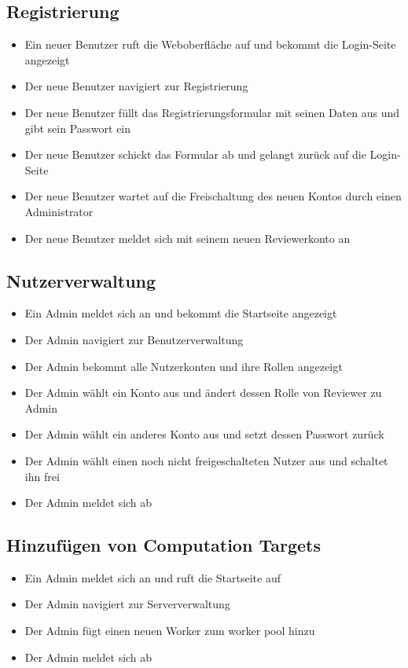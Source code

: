  \newpage
\subsection*{Registrierung}
\begin{itemize}
    \item Ein neuer Benutzer ruft die Weboberfläche auf und bekommt die Login-Seite angezeigt
    \item Der neue Benutzer navigiert zur Registrierung
    \item Der neue Benutzer füllt das Registrierungsformular mit seinen Daten aus und gibt sein Passwort ein
    \item Der neue Benutzer schickt das Formular ab und gelangt zurück auf die Login-Seite
    \item Der neue Benutzer wartet auf die Freischaltung des neuen Kontos durch einen Administrator
    \item Der neue Benutzer meldet sich mit seinem neuen \Gls{Reviewer}konto an %
\end{itemize}

\subsection*{Nutzerverwaltung}
\begin{itemize}
    \item Ein \Gls{Admin} meldet sich an und bekommt die Startseite angezeigt
    \item Der \Gls{Admin} navigiert zur Benutzerverwaltung
    \item Der \Gls{Admin} bekommt alle Nutzerkonten und ihre Rollen angezeigt
    \item Der \Gls{Admin} wählt ein Konto aus und ändert dessen Rolle von \Gls{Reviewer} zu \Gls{Admin}
    \item Der \Gls{Admin} wählt ein anderes Konto aus und setzt dessen Passwort zurück
    \item Der \Gls{Admin} wählt einen noch nicht freigeschalteten Nutzer aus und schaltet ihn frei
    \item Der \Gls{Admin} meldet sich ab
\end{itemize}


\subsection*{Hinzufügen von Computation Targets}
\begin{itemize}
    \item Ein \Gls{Admin} meldet sich an und ruft die Startseite auf
    \item Der \Gls{Admin} navigiert zur Serververwaltung
    \item Der \gls{Admin} fügt einen neuen Worker zum worker pool hinzu
    \item Der \gls{Admin} meldet sich ab
\end{itemize}
